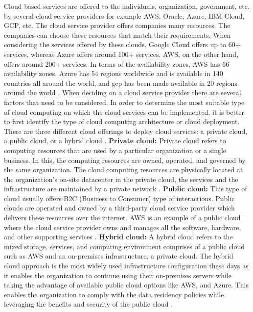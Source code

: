 \par Cloud based services are offered to the individuals,
organization, government, etc.
by several cloud service providers for example AWS, Oracle, Azure, IBM Cloud, GCP, etc.
The cloud service provider offers companies many resources. The companies can choose these resources that match their requirements.
When considering the services offered by these clouds,
Google Cloud offers up to 60+ services, whereas Azure
offers around 100+ services.
AWS, on the other hand, offers around 200+ services.
In terms of the availability zones, AWS has 66
availability zones, Azure has 54 regions worldwide and is
available in 140 countries all around the world, and
\gls{gcp} has been made available in
20 regions around the world \cite{13}.
When deciding on a cloud service provider there are
several factors that need to be considered.
In order to determine the most suitable type of cloud computing on which the cloud services can be implemented, it is better to first identify the type of cloud computing architecture or cloud deployment.
There are three different cloud offerings to deploy cloud services: a private cloud, a public cloud, or a hybrid cloud \cite{14}.
\hfill \break
\textbf{Private cloud:}
Private cloud refers to computing resources that are used by a particular organization or a single business.
In this,
the computing resources are owned, operated, and governed by the same organization.
The cloud
computing resources are physically located at the
organization’s on-site datacenter in the private cloud, the
services
and
the
infrastructure are maintained by a private network \cite{14}.
\hfill \break
\textbf{Public cloud:}
This type of cloud usually offers B2C (Business to Consumer) type of interactions. Public clouds are operated and
owned by a third-party cloud service provider which delivers these resources over the internet. AWS is an example of
a public cloud where the cloud service provider owns and manages all the software, hardware, and other supporting
services \cite{14}.
\hfill \break
\textbf{Hybrid cloud:}
A hybrid cloud refers to the mixed storage, services, and computing environment comprises of a public cloud such as
AWS and an on-premises infrastructure, a private cloud. The hybrid cloud approach is the most widely used infrastructure configuration these days as it enables the organization
to continue using their on-premises servers while taking the advantage of available public cloud options like AWS,
and Azure. This enables the organization to comply with the data residency policies while leveraging the benefits and
security of the public cloud \cite{14}.


